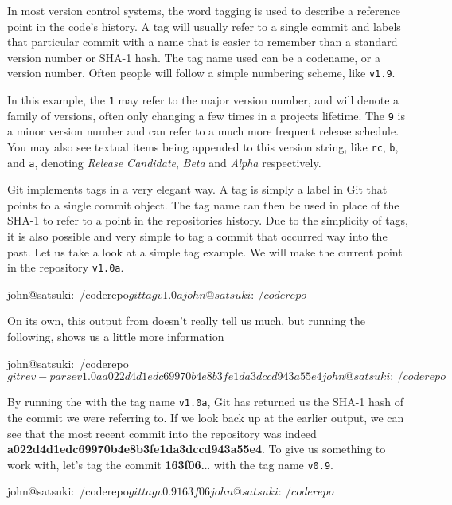 In most version control systems, the word tagging is used to describe a reference point in the code's history.
A tag will usually refer to a single commit and labels that particular commit with a name that is easier to remember than a standard version number or SHA-1 hash.
The tag name used can be a codename, or a version number.
Often people will follow a simple numbering scheme, like \texttt{v1.9}.

In this example, the \texttt{1} may refer to the major version number, and will denote a family of versions, often only changing a few times in a projects lifetime.
The \texttt{9} is a minor version number and can refer to a much more frequent release schedule.
You may also see textual items being appended to this version string, like \texttt{rc}, \texttt{b}, and \texttt{a}, denoting \emph{Release Candidate}, \emph{Beta} and \emph{Alpha} respectively.

Git implements tags in a very elegant way.
A tag is simply a label in Git that points to a single commit object.
The tag name can then be used in place of the SHA-1 to refer to a point in the repositories history.
Due to the simplicity of tags, it is also possible and very simple to tag a commit that occurred way into the past.
Let us take a look at a simple tag example.
We will make the current point in the repository \texttt{v1.0a}.

\begin{code}
john@satsuki:~/coderepo$ git tag v1.0a
john@satsuki:~/coderepo$
\end{code}

On its own, this output from  doesn't really tell us much, but running the following, shows us a little more information

\begin{code}
john@satsuki:~/coderepo$ git rev-parse v1.0a
a022d4d1edc69970b4e8b3fe1da3dccd943a55e4
john@satsuki:~/coderepo$
\end{code}

By running the  with the tag name \texttt{v1.0a}, Git has returned us the SHA-1 hash of the commit we were referring to.
If we look back up at the earlier output, we can see that the most recent commit into the repository was indeed \textbf{a022d4d1edc69970b4e8b3fe1da3dccd943a55e4}.
To give us something to work with, let's tag the commit \textbf{163f06\ldots} with the tag name \texttt{v0.9}.

\begin{code}
john@satsuki:~/coderepo$ git tag v0.9 163f06
john@satsuki:~/coderepo$
\end{code}


